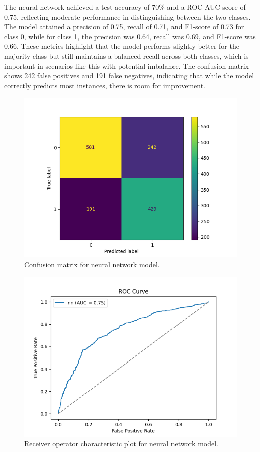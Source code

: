 	
	The neural network achieved a test accuracy of 70\% and a ROC AUC score of 0.75, reflecting moderate performance in distinguishing between the two classes. The model attained a precision of 0.75, recall of 0.71, and F1-score of 0.73 for class 0, while for class 1, the precision was 0.64, recall was 0.69, and F1-score was 0.66. These metrics highlight that the model performs slightly better for the majority class but still maintains a balanced recall across both classes, which is important in scenarios like this with potential imbalance. The confusion matrix shows 242 false positives and 191 false negatives, indicating that while the model correctly predicts most instances, there is room for improvement.
	
	
		\begin{figure}[H]
		\centering
		\includegraphics[width=0.7\linewidth]{img/nn_cm}
		\caption{Confusion matrix for neural network model.}
		\label{fig:nncm}
	\end{figure}
	
	\begin{figure}[H]
		\centering
		\includegraphics[width=0.7\linewidth]{img/nn_roc}
		\caption{Receiver operator characteristic plot for neural network model.}
		\label{fig:nnroc}
	\end{figure}
	

